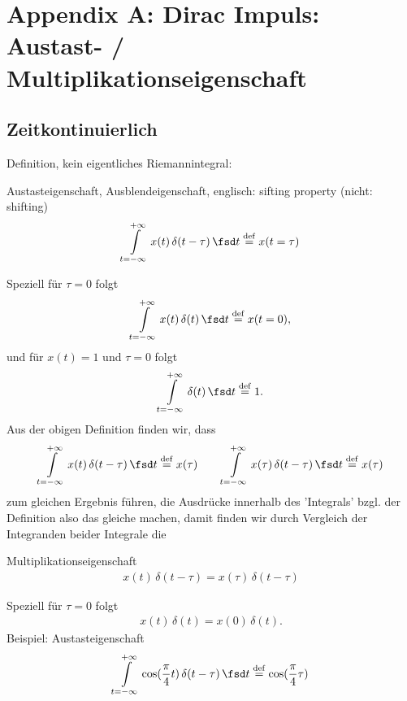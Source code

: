 \clearpage
\section{Appendix A: Dirac Impuls: Austast- / Multiplikationseigenschaft}
%
\subsection{Zeitkontinuierlich}
Definition, kein eigentliches Riemannintegral:
\begin{mdframed}
Austasteigenschaft, Ausblendeigenschaft, englisch: sifting property (nicht: shifting)
\begin{align}
\int\limits_{t=-\infty}^{+\infty} x(t) \, \delta(t-\tau) \, \fsd t \stackrel{\mathrm{def}}= x(t=\tau)
\label{eq:AppA_SifitingCT}
\end{align}
\end{mdframed}
Speziell für $\tau=0$ folgt
\begin{align}
\int\limits_{t=-\infty}^{+\infty} x(t) \, \delta(t) \, \fsd t \stackrel{\mathrm{def}}= x(t=0),
\end{align}
und für $x(t)=1$ und $\tau=0$ folgt
\begin{align}
\int\limits_{t=-\infty}^{+\infty} \delta(t) \, \fsd t \stackrel{\mathrm{def}}= 1.
\end{align}
Aus der obigen Definition finden wir, dass
\begin{align}
\int\limits_{t=-\infty}^{+\infty} x(t) \, \delta(t-\tau) \, \fsd t \stackrel{\mathrm{def}}= x(\tau)\qquad
\int\limits_{t=-\infty}^{+\infty} x(\tau) \, \delta(t-\tau) \, \fsd t \stackrel{\mathrm{def}}= x(\tau)
\end{align}
zum gleichen Ergebnis führen, die Ausdrücke innerhalb des 'Integrals' bzgl.
der Definition also das gleiche machen, damit finden wir durch Vergleich der Integranden beider Integrale die
\begin{mdframed}
Multiplikationseigenschaft
\begin{align}
x(t) \, \delta(t-\tau) = x(\tau) \, \delta(t-\tau)
\end{align}
\end{mdframed}
Speziell für $\tau=0$ folgt
\begin{align}
x(t) \, \delta(t) = x(0) \, \delta(t).
\end{align}
%
Beispiel:
Austasteigenschaft
\begin{align}
\int\limits_{t=-\infty}^{+\infty} \cos(\frac{\pi}{4} t) \, \delta(t-\tau) \, \fsd t \stackrel{\mathrm{def}}=\cos(\frac{\pi}{4} \tau)
\end{align}
